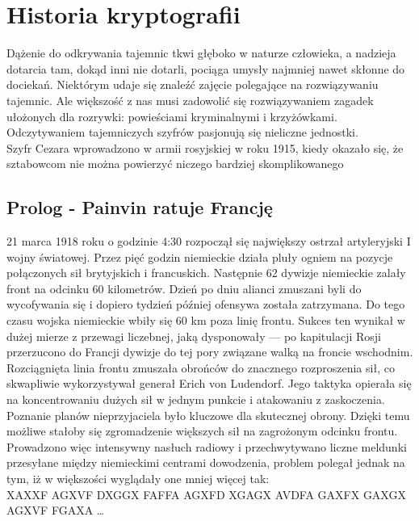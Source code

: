 \documentclass[a4paper, 10pt] {article}
\begin{document}
\section{Historia kryptografii}
Dążenie do odkrywania tajemnic tkwi głęboko w naturze człowieka, a nadzieja dotarcia tam, dokąd inni nie dotarli, pociąga umysły najmniej nawet skłonne do dociekań. Niektórym udaje się znaleźć zajęcie polegające na rozwiązywaniu tajemnic. Ale większość z nas musi zadowolić się rozwiązywaniem zagadek ułożonych dla rozrywki: powieściami kryminalnymi i krzyżówkami. Odczytywaniem tajemniczych szyfrów pasjonują się nieliczne jednostki. \\ Szyfr Cezara wprowadzono w armii rosyjskiej w roku 1915, kiedy okazało się, że sztabowcom nie
można powierzyć niczego bardziej skomplikowanego
\subsection{ Prolog - Painvin ratuje Francję}
21 marca 1918 roku o godzinie 4:30 rozpoczął się największy ostrzał artyleryjski I wojny światowej. Przez pięć godzin niemieckie działa pluły ogniem na pozycje połączonych sił brytyjskich i francuskich. Następnie 62 dywizje niemieckie zalały front na odcinku 60 kilometrów. Dzień po dniu alianci zmuszani byli do wycofywania się i dopiero tydzień później ofensywa została zatrzymana. Do tego czasu wojska niemieckie wbiły się 60 km poza linię frontu. Sukces ten wynikał w dużej mierze z przewagi liczebnej, jaką dysponowały — po kapitulacji Rosji przerzucono do Francji dywizje do tej pory związane walką na froncie wschodnim. Rozciągnięta linia frontu zmuszała obrońców do znacznego rozproszenia sił, co skwapliwie wykorzystywał generał Erich von Ludendorf. Jego taktyka opierała się na koncentrowaniu dużych sił w jednym punkcie i atakowaniu z zaskoczenia. Poznanie planów nieprzyjaciela było kluczowe dla skutecznej obrony. Dzięki temu możliwe stałoby się zgromadzenie większych sił na zagrożonym odcinku frontu. Prowadzono więc intensywny nasłuch radiowy i przechwytywano liczne meldunki przesyłane między niemieckimi centrami dowodzenia, problem polegał jednak na tym, iż w większości wyglądały one mniej więcej tak:
\\
\newline
\indent XAXXF AGXVF DXGGX FAFFA AGXFD XGAGX AVDFA GAXFX  
\newline 
\indent GAXGX AGXVF FGAXA \ldots
\\
\end{document}
